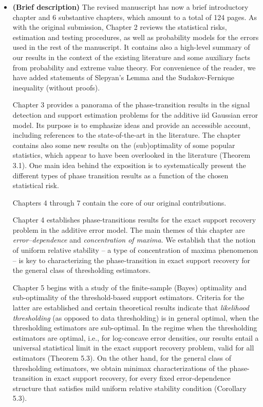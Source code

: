 \documentclass[11pt]{article}
\begin{document}
 \begin{itemize}
  \item {\bf (Brief description)} The revised manuscript has now a brief introductory chapter and 6 substantive chapters, 
  which amount to a total of 124 pages. As with the original submission,  Chapter 2 reviews the statistical risks, estimation and testing procedures,
  as well as probability models for the errors used in the rest of the manuscript.  It contains also a high-level summary of our results 
  in the context of the existing literature and some auxiliary facts from probability and extreme value theory.  For convenience of the reader, we 
  have added statements of Slepyan's Lemma and the Sudakov-Fernique inequality (without proofs).
  
   Chapter 3 provides a panorama of the phase-transition results in the signal detection and support estimation problems for the additive
   iid Gaussian error model.  Its purpose is to emphasize ideas and provide an accessible account, including references to the state-of-the-art 
   in the literature.  The chapter contains also some new results on the (sub)optimality of some popular statistics, which appear to have been 
   overlooked in the literature (Theorem 3.1).  One main idea  behind the exposition is to systematically present the different types of phase transition 
   results as a function of the chosen statistical risk.  
   
   Chapters 4 through 7 contain the core of our original contributions.  
   
   Chapter 4 establishes phase-transitions results for the exact support recovery problem in the additive error model.  The main themes of this 
   chapter are {\em error--dependence} and {\em concentration of maxima}. We establish that the notion of uniform relative stability -- 
   a type of concentration of maxima phenomenon -- is key to characterizing the phase-transition in exact support recovery for the general class 
   of thresholding estimators. 
   
   Chapter 5 begins with a study of the finite-sample (Bayes) optimality and sub-optimality of the threshold-based support estimators.  
   Criteria for the latter are established and certain theoretical results indicate that {\em likelihood thresholding} (as opposed to data thresholding)
   is in general optimal, when the thresholding estimators are sub-optimal.  In the regime when the thresholding estimators are optimal, i.e., 
   for log-concave error densities, our results entail 
   a universal statistical limit in the exact support recovery problem, valid for all estimators (Theorem 5.3).   On the other hand, for the general class of
   thresholding estimators, we obtain minimax characterizations of the phase-transition in exact support recovery, for every fixed error-dependence 
   structure that satisfies mild uniform relative stability condition (Corollary 5.3).
   

\end{itemize}
\end{document}
